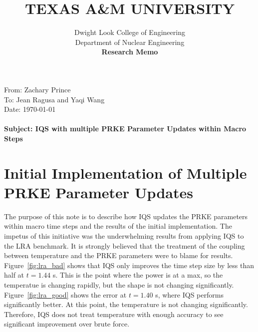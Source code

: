 \documentclass[11pt]{scrartcl}
\newcommand{\subj}{\\\hspace{-5mm}\textbf{Subject: IQS with multiple PRKE Parameter Updates within Macro Steps}}
\newcommand{\from}{\vspace{-20mm}\hspace{-1mm} \normalfont From: Zachary Prince \\}
\newcommand{\toms}{\hspace{-5mm} To: Jean Ragusa and Yaqi Wang \\}
\newcommand{\datet}{\hspace{-5mm} Date: \today \\}
\begin{document}

\title{\normalfont \Large TEXAS A\&M UNIVERSITY}
\subtitle{\normalfont Dwight Look College of Engineering \\ Department of Nuclear Engineering \\ \Large \textbf{Research Memo}}
\date{}


\maketitle
\from
\toms
\datet
\subj

\section{\large Initial Implementation of Multiple PRKE Parameter Updates}

The purpose of this note is to describe how IQS updates the PRKE parameters within macro time steps and the results of the initial implementation.  The impetus of this initiative was the underwhelming results from applying IQS to the LRA benchmark.  It is strongly believed that the treatment of the coupling between temperature and the PRKE parameters were to blame for results.  Figure~\ref{fig:lra_bad} shows that IQS only improves the time step size by less than half at $t=1.44$ s.  This is the point where the power is at a max, so the temperatue is changing rapidly, but the shape is not changing significantly.  Figure~\ref{fig:lra_good} shows the error at $t=1.40$ s, where IQS performs significantly better.  At this point, the temperature is not changing significantly.  Therefore, IQS does not treat temperature with enough accuracy to see significant improvement over brute force.
\end{document}
